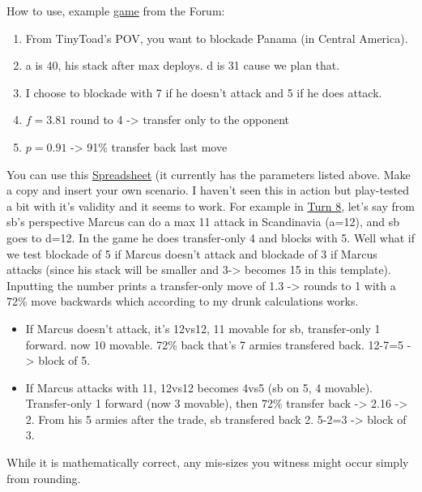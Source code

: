 How to use, example \href{https://www.warzone.com/MultiPlayer?GameID=11038333}{game} from the Forum:
\begin{enumerate}
    \item From TinyToad's POV, you want to blockade Panama (in Central America).
    \item a is 40, his stack after max deploys. d is 31 cause we plan that.
    \item I choose to blockade with 7 if he doesn't attack and 5 if he does attack.
    \item $f=3.81$ round to 4 -> transfer only to the opponent
    \item $p=0.91$ -> 91\% transfer back last move
\end{enumerate}

You can use this \href{https://docs.google.com/spreadsheets/d/1twgkhrvvzQ-SEY8ad3hSIEKupteou-Vpi9Ahl61yaOI/edit?usp=sharing}{Spreadsheet} (it currently has the parameters listed above. Make a copy and insert your own scenario. I haven't seen this in action but play-tested a bit with it's validity and it seems to work. For example in \href{https://www.warzone.com/MultiPlayer?GameID=40353006}{Turn 8}, let's say from sb's perspective Marcus can do a max 11 attack in Scandinavia (a=12), and sb goes to d=12. In the game he does transfer-only 4 and blocks with 5. Well what if we test blockade of 5 if Marcus doesn't attack and blockade of 3 if Marcus attacks (since his stack will be smaller and 3-> becomes 15 in this template). Inputting the number prints a transfer-only move of 1.3 -> rounds to 1 with a 72\% move backwards which according to my drunk calculations works.
\begin{itemize}
    \item If Marcus doesn't attack, it's 12vs12, 11 movable for sb, transfer-only 1 forward. now 10 movable. 72\% back that's 7 armies transfered back. 12-7=5 -> block of 5.
    \item If Marcus attacks with 11, 12vs12 becomes 4vs5 (sb on 5, 4 movable). Transfer-only 1 forward (now 3 movable), then 72\% transfer back -> 2.16 -> 2. From his 5 armies after the trade, sb transfered back 2. 5-2=3 -> block of 3.
\end{itemize}

While it is mathematically correct, any mis-sizes you witness might occur simply from rounding.